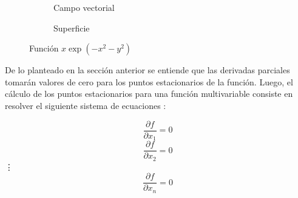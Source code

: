 \begin{figure}[h]  
\centering 
\begin{subfigure}[b]{0.49\linewidth}

 \caption{Campo vectorial} \label{fig:M1} 
\end{subfigure}
\begin{subfigure}[b]{0.49\linewidth}
  
 \caption{Superficie} \label{fig:M1} 

\end{subfigure}
 \caption{Función $x  \exp(-x^2-y^2)$ } \label{fig: gradiente} 

\end{figure}

De lo planteado en la sección anterior se entiende que las derivadas parciales tomarán valores de cero para los puntos estacionarios de la función. Luego, el cálculo de los puntos estacionarios para una función multivariable consiste en resolver el siguiente sistema de  ecuaciones \cite{soliman_mathematical_2012}:
\begin{center}
\begin{equation}
 \frac{\partial f}{\partial x_1}=0
\end{equation}
\begin{equation}
 \frac{\partial f}{\partial x_2}=0
\end{equation}
\vdots
\begin{equation}
 \frac{\partial f}{\partial x_n}=0
\end{equation}
\end{center}


